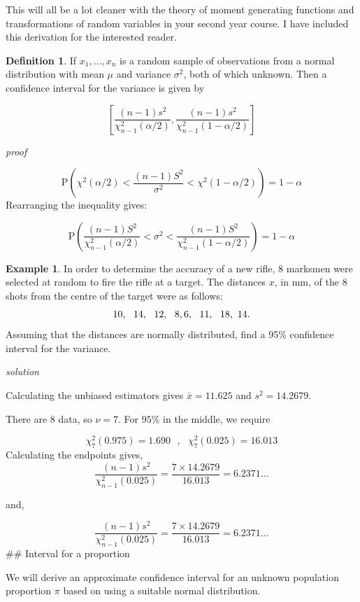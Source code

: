 \documentclass[
]{book}
\theoremstyle{definition}
\newtheorem{definition}{Definition}[chapter]
\theoremstyle{definition}
\newtheorem{example}{Example}[chapter]
\theoremstyle{definition}
\theoremstyle{definition}
\theoremstyle{remark}
\begin{document}
This will all be a lot cleaner with the theory of moment generating functions and transformations of random variables in your second year course. I have included this derivation for the interested reader.

\begin{definition}
If \(x_1,\ldots,x_n\) is a random sample of observations from a normal distribution with mean \(\mu\) and variance \(\sigma^2\), both of which unknown. Then a confidence interval for the variance is given by

\[\left[ \frac{(n-1)s^2}{\chi^2_{n-1}(\alpha / 2)},\frac{(n-1)s^2}{\chi^2_{n-1}(1-\alpha / 2)}\right]\]
\end{definition}

\emph{proof}

\[\text{P}\left( \chi^2(\alpha / 2)<\frac{(n-1)S^2}{\sigma^2} < \chi^2(1-\alpha/2) \right) = 1-\alpha \]
Rearranging the inequality gives:

\[\text{P}\left( \frac{(n-1)S^2}{\chi^2_{n-1}(\alpha / 2)}<\sigma^2 < \frac{(n-1)S^2}{\chi^2_{n-1}(1-\alpha / 2)} \right) = 1-\alpha \]

\begin{example}
In order to determine the accuracy of a new rifle, \(8\) marksmen were selected at random to fire the
rifle at a target. The distances \(x\), in mm, of the \(8\) shots from the centre of the target were as follows:
\[10, \ \ 14, \ \ 12,\ \ 8, \\ 6,  \ \ 11,  \ \ 18, \ 14.\]
Assuming that the distances are normally distributed, find a 95\% confidence interval for the variance.
\end{example}

\emph{solution}

Calculating the unbiased estimators gives \(\bar{x}=11.625\) and \(s^2 = 14.2679\).

There are \(8\) data, so \(\nu = 7\). For \(95\%\) in the middle, we require

\[\chi^2_7 (0.975) = 1.690 \ \ \ ,\ \ \ \chi^2_7(0.025)=16.013\]
Calculating the endpoints gives,
\[\frac{(n-1)s^2}{\chi^2_{n-1}(0.025)}= \frac{7\times 14.2679}{16.013} = 6.2371\ldots\]

and,

\[\frac{(n-1)s^2}{\chi^2_{n-1}(0.025)}= \frac{7\times 14.2679}{16.013} = 6.2371\ldots\]
\#\# Interval for a proportion

We will derive an approximate confidence interval for an unknown population proportion \(\pi\) based on using a suitable normal distribution.
\end{document}

